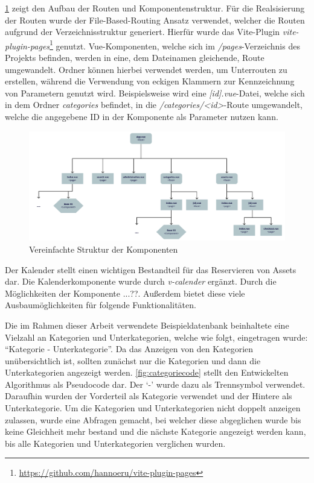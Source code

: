 \ref{fig:Komponenten} zeigt den Aufbau der Routen und Komponentenstruktur. Für die Realsisierung der
Routen wurde der File-Based-Routing Ansatz verwendet, welcher die Routen aufgrund der
Verzeichnisstruktur generiert. Hierfür wurde das Vite-Plugin
\textit{vite-plugin-pages}\footnote{\url{https://github.com/hannoeru/vite-plugin-pages}} genutzt.
Vue-Komponenten, welche sich im \textit{/pages}-Verzeichnis des Projekts befinden, werden in eine,
dem Dateinamen gleichende, Route umgewandelt. Ordner können hierbei verwendet werden, um Unterrouten
zu erstellen, während die Verwendung von eckigen Klammern zur Kennzeichnung von Parametern genutzt
wird. Beispielsweise wird eine \textit{[id].vue}-Datei, welche sich
in dem Ordner \textit{categories} befindet, in die \textit{/categories/<id>}-Route umgewandelt,
welche die angegebene ID in der Komponente als Parameter nutzen kann. 
 
\begin{figure}[h]
  \centering
  \includegraphics[scale=0.5]{Bilder/struktur.pdf}
  \caption[Vereinfachte Struktur der Komponenten]{Vereinfachte Struktur der Komponenten}
  \label{fig:Komponenten}
\end{figure}


Der Kalender stellt einen wichtigen Bestandteil für das Reservieren von Assets dar. Die
Kalenderkomponente wurde durch \textit{v-calender} ergänzt. Durch die Möglichkeiten der Komponente
...??. Außerdem bietet diese viele Ausbaumöglichkeiten für folgende Funktionalitäten.

Die im Rahmen dieser Arbeit verwendete Beispieldatenbank beinhaltete eine Vielzahl an Kategorien und
Unterkategorien, welche wie folgt, eingetragen wurde: \enquote{Kategorie - Unterkategorie}. Da das
Anzeigen von den Kategorien unübersichtlich ist, sollten zunächst nur die Kategorien und dann die
Unterkategorien angezeigt werden. \ref{fig:categoriecode} stellt den Entwickelten Algorithmus als
Pseudocode dar. Der \enquote*{-} wurde dazu als Trennsymbol verwendet. Daraufhin wurden der
Vorderteil als Kategorie verwendet und der Hintere als Unterkategorie. Um die Kategorien und
Unterkategorien nicht doppelt anzeigen zulassen, wurde eine Abfragen gemacht, bei welcher diese
abgeglichen wurde bis keine Gleichheit mehr bestand und die nächste Kategorie angezeigt werden kann,
bis alle Kategorien und Unterkategorien verglichen wurden.




